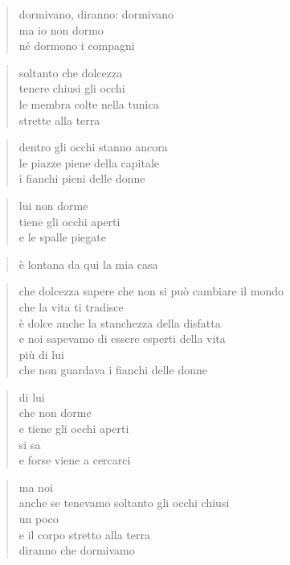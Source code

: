 \clearpage


	\begin{verse}
		dormivano, diranno: dormivano\\
		ma io non dormo\\
		né dormono i compagni
	\end{verse}

	\begin{verse}
		soltanto che dolcezza\\
		tenere chiusi gli occhi\\
		le membra colte nella tunica\\
		strette alla terra
	\end{verse}

	\begin{verse}
		dentro gli occhi stanno ancora\\
		le piazze piene della capitale\\
		i fianchi pieni delle donne
	\end{verse}

	\begin{verse}
		lui non dorme\\
		tiene gli occhi aperti\\
		e le spalle piegate
	\end{verse}

	\begin{verse}
		è lontana da qui la mia casa
	\end{verse}

	\begin{verse}
		che dolcezza sapere che non si può cambiare il mondo\\
		che la vita ti tradisce \\
		è dolce anche la stanchezza della disfatta\\
		e noi sapevamo di essere esperti della vita\\
		più di lui\\
		che non guardava i fianchi delle donne
	\end{verse}

	\begin{verse}
		di lui\\
		che non dorme\\
		e tiene gli occhi aperti\\
		si sa\\
		e forse viene a cercarci
	\end{verse}

	\begin{verse}
		ma noi\\
		anche se tenevamo soltanto gli occhi chiusi\\
		un poco\\
		e il corpo stretto alla terra\\
		diranno che dormivamo
	\end{verse}

